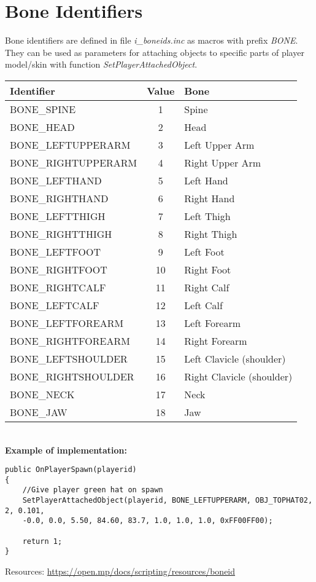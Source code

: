 \documentclass{article}
\begin{document}
\section{Bone Identifiers}
\begin{sloppypar}
Bone identifiers are defined in file \textit{i\_boneids.inc} as macros with prefix \textit{BONE}. They can be used as parameters for attaching objects to specific parts of player model/skin with function \textit{SetPlayerAttachedObject}.
\end{sloppypar}
\bigskip
\noindent\begin{tabular}{ |l|c|l| } 
\hline
Identifier & Value & Bone \\
\hline
BONE\_SPINE & 1 & Spine \\
BONE\_HEAD & 2 & Head \\
BONE\_LEFTUPPERARM & 3 & Left Upper Arm \\
BONE\_RIGHTUPPERARM & 4 & Right Upper Arm \\
BONE\_LEFTHAND & 5 & Left Hand \\
BONE\_RIGHTHAND & 6 & Right Hand \\
BONE\_LEFTTHIGH & 7 & Left Thigh \\
BONE\_RIGHTTHIGH & 8 & Right Thigh \\
BONE\_LEFTFOOT & 9 & Left Foot \\
BONE\_RIGHTFOOT & 10 & Right Foot \\
BONE\_RIGHTCALF & 11 & Right Calf \\
BONE\_LEFTCALF & 12 & Left Calf \\
BONE\_LEFTFOREARM & 13 & Left Forearm \\
BONE\_RIGHTFOREARM & 14 & Right Forearm \\
BONE\_LEFTSHOULDER & 15 & Left Clavicle (shoulder) \\
BONE\_RIGHTSHOULDER & 16 & Right Clavicle (shoulder) \\
BONE\_NECK & 17 & Neck \\
BONE\_JAW & 18 & Jaw \\
\hline
\end{tabular}
\bigskip
\\\textbf{Example of implementation:}
\begin{verbatim}
public OnPlayerSpawn(playerid)
{
    //Give player green hat on spawn
    SetPlayerAttachedObject(playerid, BONE_LEFTUPPERARM, OBJ_TOPHAT02, 2, 0.101, 
    -0.0, 0.0, 5.50, 84.60, 83.7, 1.0, 1.0, 1.0, 0xFF00FF00);

    return 1;
}
\end{verbatim}
\bigskip
Resources: \url{https://open.mp/docs/scripting/resources/boneid}
\end{document}
